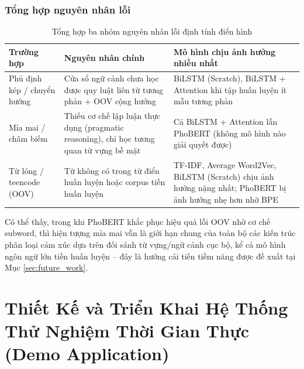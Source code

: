 \documentclass[12pt,a4paper]{article}
\begin{document}
\subsubsection{Tổng hợp nguyên nhân lỗi}\label{sec:error_summary}
\begin{table}[H]
    \centering
    \caption{Tổng hợp ba nhóm nguyên nhân lỗi định tính điển hình}
    \renewcommand{\arraystretch}{1.3}
    \begin{tabular}{|>{\raggedright\arraybackslash}p{3.6cm}|>{\raggedright\arraybackslash}p{4.4cm}|>{\raggedright\arraybackslash}p{6.2cm}|}
        \hline
        \textbf{Trường hợp} & \textbf{Nguyên nhân chính} & \textbf{Mô hình chịu ảnh hưởng nhiều nhất} \\
        \hline
        Phủ định kép / chuyển hướng & Cửa sổ ngữ cảnh chưa học được quy luật liên từ tương phản + OOV cộng hưởng & BiLSTM (Scratch), BiLSTM + Attention khi tập huấn luyện ít mẫu tương phản \\
        \hline
        Mỉa mai / châm biếm & Thiếu cơ chế lập luận thực dụng (pragmatic reasoning), chỉ học tương quan từ vựng bề mặt & Cả BiLSTM + Attention lẫn PhoBERT (không mô hình nào giải quyết được) \\
        \hline
        Từ lóng / teencode (OOV) & Từ không có trong từ điển huấn luyện hoặc corpus tiền huấn luyện & TF-IDF, Average Word2Vec, BiLSTM (Scratch) chịu ảnh hưởng nặng nhất; PhoBERT bị ảnh hưởng nhẹ hơn nhờ BPE \\
        \hline
    \end{tabular}
    \label{tab:error_summary}
\end{table}

Có thể thấy, trong khi PhoBERT khắc phục hiệu quả lỗi OOV nhờ cơ chế subword, thì hiện tượng mỉa mai vẫn là giới hạn chung của toàn bộ các kiến trúc phân loại cảm xúc dựa trên đối sánh từ vựng/ngữ cảnh cục bộ, kể cả mô hình ngôn ngữ lớn tiền huấn luyện -- đây là hướng cải tiến tiềm năng được đề xuất tại Mục \ref{sec:future_work}.

\newpage
\section{Thiết Kế và Triển Khai Hệ Thống Thử Nghiệm Thời Gian Thực (Demo Application)}\label{sec:chuong4_demo}
\end{document}
